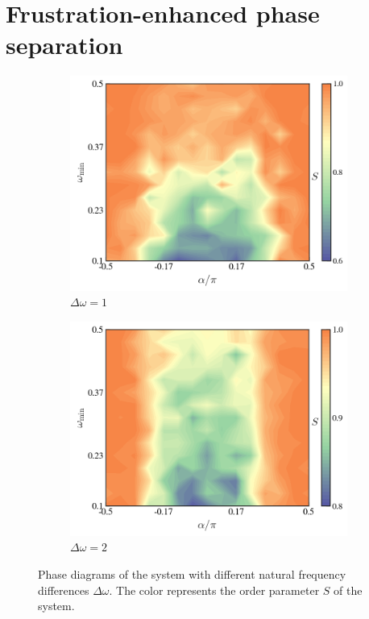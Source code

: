 \documentclass{article}
\begin{document}
\section{\label{sec:behaviors}Frustration-enhanced phase separation}
\begin{figure}
    \centering
    \begin{subfigure}{0.45\textwidth}
        \centering
        \includegraphics[width=1\textwidth]{figs/pd1.png}
        \caption{$\Delta \omega=1$}
        \label{fig:phaseSeparation_singleChirality}
    \end{subfigure}
    \begin{subfigure}{0.45\textwidth}
        \centering
        \includegraphics[width=1\textwidth]{figs/pd2.png}
        \caption{$\Delta \omega=2$}
        \label{fig:phaseSeparation_doubleChirality}
    \end{subfigure}
    \caption{Phase diagrams of the system with different natural frequency differences $\Delta \omega$. The color represents the order parameter $S$ of the system.}
    \label{fig:phaseSeparation}
\end{figure}
\end{document}
